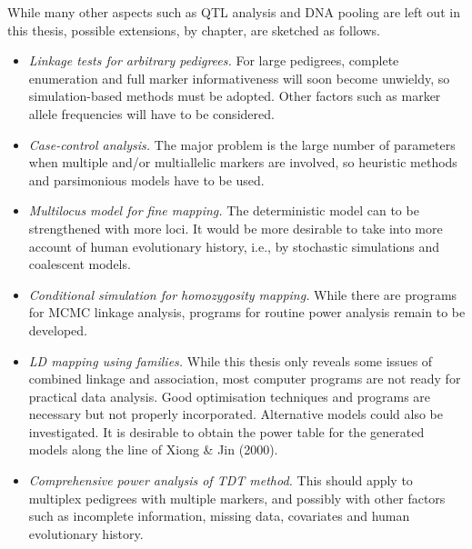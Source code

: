While many other aspects such as QTL analysis and DNA pooling are left out in
this thesis, possible extensions, by chapter, are sketched as follows.

\begin{itemize}

\item{\em Linkage tests for arbitrary pedigrees.} For large pedigrees,
complete enumeration and full marker informativeness will soon become unwieldy,
so simulation-based methods must be adopted.  Other factors such as marker
allele frequencies will have to be considered.

\item{\em Case-control analysis.} The major problem is the large number of
parameters when multiple and/or multiallelic markers are involved, so
heuristic methods and parsimonious models have to be used.

\item{\em Multilocus model for fine mapping.} The deterministic model can
to be strengthened with more loci.  It would be more desirable to take into
more account of human evolutionary history, i.e., by stochastic simulations
and coalescent models.

\item{\em Conditional simulation for homozygosity mapping.} While there are
programs for MCMC linkage analysis, programs for routine power analysis
remain to be developed.

\item{\em LD mapping using families.} While this thesis only reveals some
issues of combined linkage and association, most computer programs are not
ready for practical data analysis.  Good optimisation techniques and programs
are necessary but not properly incorporated. Alternative models could also be
investigated. It is desirable to obtain the power table for the generated
models along the line of Xiong \& Jin (2000).

\item{\em Comprehensive power analysis of TDT method.} This should apply to
multiplex pedigrees with multiple markers, and possibly with other
factors such as incomplete information, missing data, covariates and human
evolutionary history.

\end{itemize}

